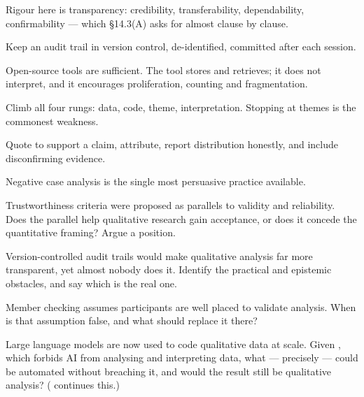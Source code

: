 \begin{chaptersummary}
\begin{tight}
  \item Rigour here is transparency: credibility, transferability,
    dependability, confirmability --- which \S14.3(A) asks for almost clause by
    clause.
  \item Keep an audit trail in version control, de-identified, committed after
    each session.
  \item Open-source tools are sufficient. The tool stores and retrieves; it
    does not interpret, and it encourages proliferation, counting and
    fragmentation.
  \item Climb all four rungs: data, code, theme, interpretation. Stopping at
    themes is the commonest weakness.
  \item Quote to support a claim, attribute, report distribution honestly, and
    include disconfirming evidence.
  \item Negative case analysis is the single most persuasive practice
    available.
\end{tight}
\end{chaptersummary}

\begin{reviewq}
  \item Trustworthiness criteria were proposed as parallels to validity and
    reliability. Does the parallel help qualitative research gain acceptance,
    or does it concede the quantitative framing? Argue a position.
  \item Version-controlled audit trails would make qualitative analysis far
    more transparent, yet almost nobody does it. Identify the practical and
    epistemic obstacles, and say which is the real one.
  \item Member checking assumes participants are well placed to validate
    analysis. When is that assumption false, and what should replace it there?
  \item Large language models are now used to code qualitative data at scale.
    Given , which forbids AI from analysing and
    interpreting data, what --- precisely --- could be automated without
    breaching it, and would the result still be qualitative analysis?
    ( continues this.)
\end{reviewq}

